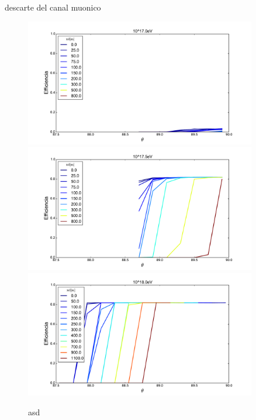 	descarte del canal muonico
	
	
	\begin{figure}[h!]
		\begin{center}
				\includegraphics[width=0.9\textwidth]{fig/resultadosRadio/eff75_0_4_0_1500_0_1500_0_60_0_1_0_17_0_m2.pdf} 
				\includegraphics[width=0.9\textwidth]{fig/resultadosRadio/eff75_0_4_0_1500_0_1500_0_60_0_1_0_17_5_m2.pdf}
				\includegraphics[width=0.9\textwidth]{fig/resultadosRadio/eff75_0_4_0_1500_0_1500_0_60_0_1_0_18_0_m2.pdf}
			\caption{asd}
			\label{fig:}
		\end{center}
	\end{figure}
	

